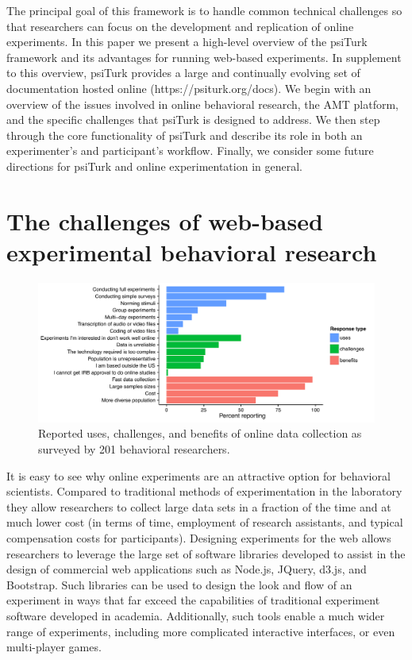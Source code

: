 \documentclass[twocolumn]{svjour3}          %
\newcommand{\psiturk}[0]{\textsf{psiTurk}}
\begin{document}
The principal goal of this framework is to handle common technical 
challenges so that researchers can focus on the development and replication
of online experiments.  In this paper we present a high-level overview of the 
\psiturk{} framework and its advantages for running web-based experiments.
In supplement to this overview, \psiturk{} provides a large and continually
evolving set of documentation hosted online (\textsf{https://psiturk.org/docs}).
We begin with an overview of the issues involved in online 
behavioral research,  the AMT platform, and the specific challenges that \psiturk{} is designed to 
address.  We then  step through the core functionality of \psiturk{} and 
describe its role in both an experimenter's and participant's workflow.  Finally, we
consider some future directions for \psiturk{} and online experimentation in 
general.



\section{The challenges of web-based experimental behavioral research}

\begin{figure}[tp]
\centering
\includegraphics[width=\textwidth]{figures/combinedquestionsedited.pdf}
\caption{Reported uses, challenges, and benefits of online data collection as surveyed
by 201 behavioral researchers.}
\label{fig:survey}
\end{figure}

It is easy to see why online experiments are an attractive option for behavioral 
scientists.  Compared to traditional methods of experimentation in the laboratory
they allow researchers to collect large data sets in a fraction of the time and at 
much lower cost (in terms of time, employment of research assistants, and typical 
compensation costs for participants).  Designing experiments for the web allows 
researchers to leverage the large set of software libraries developed to assist 
in the design of commercial web applications such as Node.js, JQuery, d3.js, 
and Bootstrap.  Such libraries can be used to design the look and flow of an 
experiment in ways 
that far exceed the capabilities of traditional experiment software developed 
in academia.  Additionally, such tools enable a much wider range of experiments, 
including more complicated interactive interfaces, or even multi-player games.
\end{document}
